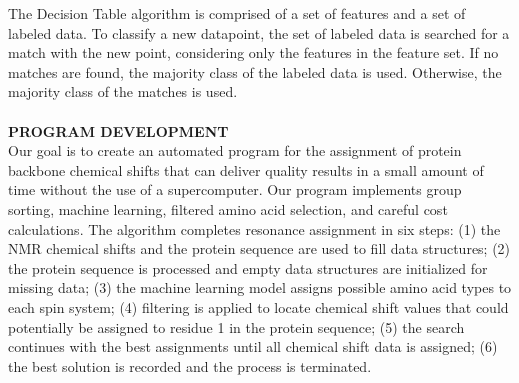 \documentclass{article}
\begin{document}
The Decision Table algorithm \cite{decisiontable_algorithm} is comprised of a set of features and a set of labeled data. To classify a new datapoint, the set of labeled data is searched for a match with the new point, considering only the features in the feature set. If no matches are found, the majority class of the labeled data is used. Otherwise, the majority class of the matches is used.
\\\\
\noindent\textbf{PROGRAM DEVELOPMENT}\\
Our goal is to create an automated program for the assignment of protein backbone chemical shifts that can deliver quality results in a small amount of time without the use of a supercomputer. Our program implements group sorting, machine learning, filtered amino acid selection, and careful cost calculations. The algorithm completes resonance assignment in six steps: (1) the NMR chemical shifts and the protein sequence are used to fill data structures; (2) the protein sequence is processed and empty data structures are initialized for missing data; (3) the machine learning model assigns possible amino acid types to each spin system; (4) filtering is applied to locate chemical shift values that could potentially be assigned to residue 1 in the protein sequence; (5) the search continues with the best assignments until all chemical shift data is assigned; (6) the best solution is recorded and the process is terminated. 
\end{document}
